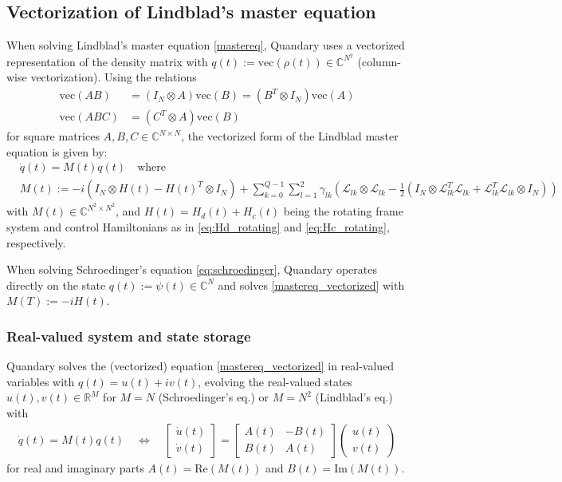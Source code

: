 \documentclass[11pt]{article}
\newcommand{\Ell}{\mathcal{L}}
\newcommand{\R}{\mathds{R}}
\newcommand{\C}{\mathds{C}}
\begin{document}
  \subsection{Vectorization of Lindblad's master equation}
  When solving Lindblad's master equation \eqref{mastereq}, Quandary uses a vectorized representation of the density matrix with $q(t) := \text{vec}(\rho(t)) \in \C^{N^2}$ (column-wise vectorization). Using the
  relations
  \begin{align}
   \text{vec}(AB) &= (I_N\otimes A)\text{vec}(B) = (B^T\otimes I_N)\text{vec}(A)
    \\
   \text{vec}(ABC) &= (C^T\otimes A)\text{vec}(B)
  \end{align}
  for square matrices $A,B,C\in\C^{N\times N}$, the vectorized
  form of the Lindblad master equation is given by:
  \begin{align}\label{mastereq_vectorized}
    &\dot q(t) = M(t) q(t) \quad  \text{where} \\
    &M(t) := -i(I_N\otimes H(t) - H(t)^T \otimes I_N) + \sum_{k=0}^{Q-1}\sum_{l=1}^2 \gamma_{lk}
    \left( \Ell_{lk}\otimes \Ell_{lk} - \frac 1 2 \left( I_N\otimes
    \Ell^T_{lk}\Ell_{lk} + \Ell^T_{lk}\Ell_{lk} \otimes I_N \right) \right)
  \end{align}
   with $M(t) \in \C^{N^2\times N^2}$, and $H(t) = H_d(t) + H_c(t)$ being the rotating frame system and control Hamiltonians as in \eqref{eq:Hd_rotating} and \eqref{eq:Hc_rotating}, respectively.

   When solving Schroedinger's equation \eqref{eq:schroedinger}, Quandary operates directly on the state $q(t) := \psi(t)\in\C^N$ and solves \eqref{mastereq_vectorized} with $M(T) := -iH(t)$.
    
  \subsubsection{Real-valued system and state storage}
   Quandary solves the (vectorized) equation \eqref{mastereq_vectorized} in
   real-valued variables with $q(t) = u(t) + iv(t)$, evolving the real-valued
   states $u(t), v(t)\in \R^{M}$ for $M=N$ (Schroedinger's eq.) or $M=N^2$ (Lindblad's eq.) with
   \begin{align}
     \dot q(t) = M(t) q(t) \quad \Leftrightarrow \quad \begin{bmatrix} \dot u(t) \\ \dot v(t) \end{bmatrix} = 
   \begin{bmatrix} A(t) & -B(t) \\ B(t) & A(t) \end{bmatrix} 
   \begin{pmatrix} u(t) \\ v(t) \end{pmatrix} 
   \label{realvaluedODE}
   \end{align}
   for real and imaginary parts $A(t) = \mbox{Re} \left(M(t)\right)$ and $B(t) = \mbox{Im}\left(M(t)\right)$. 
\end{document}

